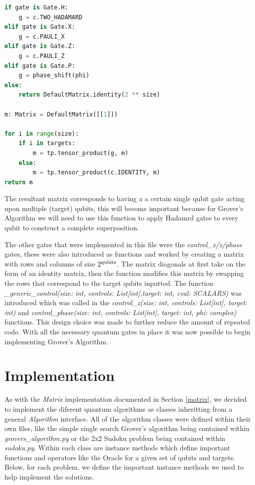 \documentclass{article}
\begin{document}
\begin{file}
\begin{lstlisting}[language=Python]
if gate is Gate.H:
    g = c.TWO_HADAMARD
elif gate is Gate.X:
    g = c.PAULI_X
elif gate is Gate.Z:
    g = c.PAULI_Z
elif gate is Gate.P:
    g = phase_shift(phi)
else:
    return DefaultMatrix.identity(2 ** size)

m: Matrix = DefaultMatrix([[1]])

for i in range(size):
    if i in targets:
        m = tp.tensor_product(g, m)
    else:
        m = tp.tensor_product(c.IDENTITY, m)
return m

\end{lstlisting}
\end{file}

The resultant matrix corresponds to having a a certain single qubit gate acting upon multiple (target) qubits, this will become important because for Grover's Algorithm we will need to use this function to apply Hadamrd gates to every qubit to construct a complete superposition. 

The other gates that were implemented in this file were the \textit{control\_x/z/phase} gates, these were also introduced as functions and worked by creating a matrix with rows and columns of size $2\textsuperscript{qubits}$. The matrix diagonals at first take on the form of an identity matrix, then the function modifies this matrix by swapping the rows that correspond to the target qubits inputted.
The function \textit{\_generic\_control(size: int, controls: List[int],target: int, cval: SCALARS)} was introduced which was called in the \textit{ control\_z(size: int, controls: List[int], target: int) } and \textit{control\_phase(size: int, controls: List[int], target: int, phi: complex)} functions. This design choice was made to further reduce the amount of repeated code. With all the necessary quantum gates in place it was now possible to begin implementing Grover’s Algorithm.

\pagebreak

\section{Implementation}

As with the \textit{Matrix} implementation documented in Section \ref{matrix}, we decided to implement the diferent quantum algorithms as classes inheritting from a general \textit{Algorithm} interface. All of the algorithm classes were defined within their own files, like the simple single search Grover's algorithm being contained within \textit{grovers\_algorithm.py} or the 2x2 Sudoku problem being contained within \textit{sudoku.py}.
Within each class are instance methods which define important functions and operators like the Oracle for a given set of qubits and targets. 
Below, for each problem, we define the important instance methods we used to help implement the solutions.
\end{document}
